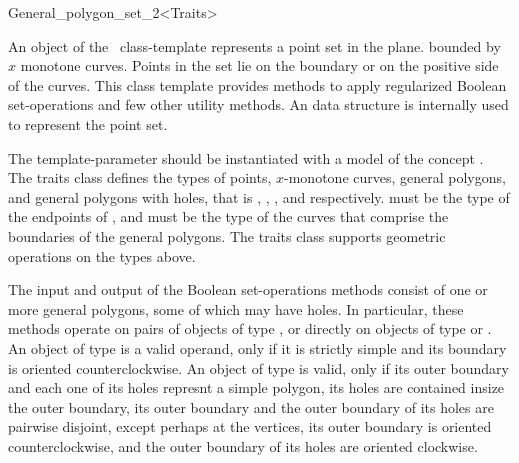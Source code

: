 \ccRefPageBegin

\begin{ccRefClass}{General_polygon_set_2<Traits>}

\ccThreeToTwo
    
\ccDefinition
An object of the \ccClassTemplateName\ class-template represents a
point set in the plane. bounded by $x$ monotone curves. Points in the set
lie on the boundary or on the positive side of the curves. This class 
template provides methods to apply regularized Boolean set-operations and 
few other utility methods. An  data structure is 
internally used to represent the point set. 

The  template-parameter should be instantiated with a
model of the concept . The traits class
defines the types of points, $x$-monotone curves, general polygons,
and general polygons with holes, that is ,
, , and 
 respectively.  must 
be the type of the endpoints of , and 
 must be the type of the curves that comprise
the boundaries of the general polygons. The traits class supports geometric 
operations on the types above.

The input and output of the Boolean set-operations methods consist of one 
or more general polygons, some of which may have holes. In particular, 
these methods operate on pairs of objects of type \ccClassTemplateName, or
directly on objects of type  or 
. An object of type 
 is a valid operand, only if it is strictly simple 
and its boundary is oriented counterclockwise. An object of type
 is valid, only if its outer boundary
and each one of its holes represnt a simple polygon, its holes are contained 
insize the outer boundary, its outer boundary and the outer boundary of its 
holes are pairwise disjoint, except perhaps at the vertices, its outer boundary
is oriented counterclockwise, and the outer boundary of its holes are 
oriented clockwise.

\ccTypes
\ccGlue
{}
\ccGlue
{} 


\end{ccRefClass}
